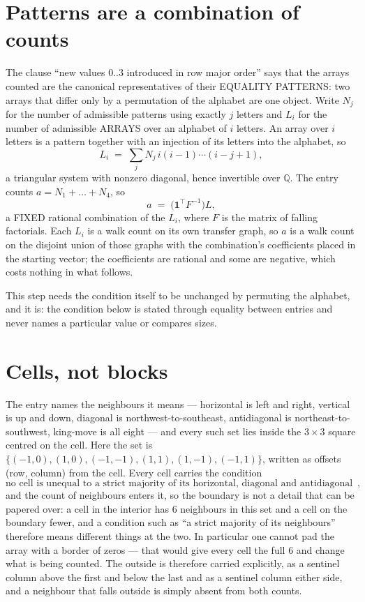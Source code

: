 \documentclass[11pt,a4paper]{article}
\theoremstyle{plain}
\theoremstyle{definition}
\begin{document}
\section{Patterns are a combination of counts}

The clause ``new values $0..3$ introduced in row major order'' says that the arrays
counted are the canonical representatives of their EQUALITY PATTERNS: two arrays that differ
only by a permutation of the alphabet are one object. Write $N_j$ for the number of admissible
patterns using exactly $j$ letters and $L_i$ for the number of admissible ARRAYS over an
alphabet of $i$ letters. An array over $i$ letters is a pattern together with an injection of
its letters into the alphabet, so
\[
L_i\;=\;\sum_{j}N_j\,i(i-1)\cdots(i-j+1),
\]
a triangular system with nonzero diagonal, hence invertible over $\mathbb{Q}$. The entry
counts $a=N_1+\dots+N_{4}$, so
\[
a\;=\;\bigl(\mathbf{1}^{\!\top}F^{-1}\bigr)L ,
\]
a FIXED rational combination of the $L_i$, where $F$ is the matrix of falling factorials.
Each $L_i$ is a walk count on its own transfer graph, so $a$ is a walk count on the disjoint
union of those graphs with the combination's coefficients placed in the starting vector; the
coefficients are rational and some are negative, which costs nothing in what follows.

This step needs the condition itself to be unchanged by permuting the alphabet, and it is:
the condition below is stated through equality between entries and never names a particular
value or compares sizes.

\section{Cells, not blocks}

The entry names the neighbours it means --- horizontal is left and right, vertical is up and
down, diagonal is northwest-to-southeast, antidiagonal is northeast-to-southwest, king-move is
all eight --- and every such set lies inside the $3\times3$ square centred on the cell. Here
the set is $\{(-1,0), (1,0), (-1,-1), (1,1), (1,-1), (-1,1)\}$, written as offsets (row, column) from the cell. Every cell carries
the condition
\[
\text{no cell is unequal to a strict majority of its horizontal, diagonal and antidiagonal neighbours},
\]
and the count of neighbours enters it, so the boundary is not a detail that can be papered
over: a cell in the interior has $6$ neighbours in this set and a cell on the boundary
fewer, and a condition such as ``a strict majority of its neighbours'' therefore means
different things at the two. In particular one cannot pad the array with a border of zeros ---
that would give every cell the full $6$ and change what is being counted. The outside is
therefore carried
explicitly, as a sentinel column above the first and below the last and as a sentinel column
either side, and a neighbour that falls outside is simply absent from both counts.
\end{document}
